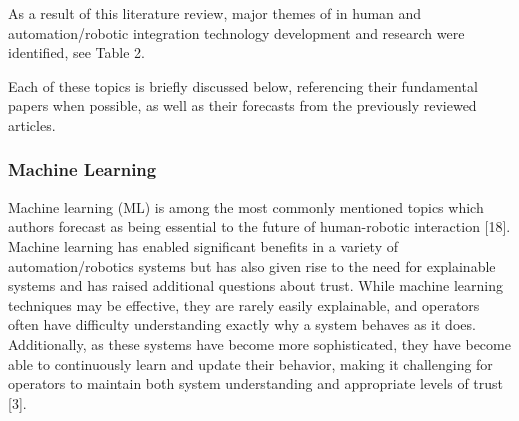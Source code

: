 As a result of this literature review, major themes of in human and automation/robotic integration technology development and research were identified, see Table 2.


Each of these topics is briefly discussed below, referencing their fundamental papers when possible, as well as their forecasts from the previously reviewed articles.

\subsubsection{Machine Learning}
Machine learning (ML) is among the most commonly mentioned topics which authors forecast as being essential to the future of human-robotic interaction [18]. Machine learning has enabled significant benefits in a variety of automation/robotics systems but has also given rise to the need for explainable systems and has raised additional questions about trust. While machine learning techniques may be effective, they are rarely easily explainable, and operators often have difficulty understanding exactly why a system behaves as it does. Additionally, as these systems have become more sophisticated, they have become able to continuously learn and update their behavior, making it challenging for operators to maintain both system understanding and appropriate levels of trust [3].

